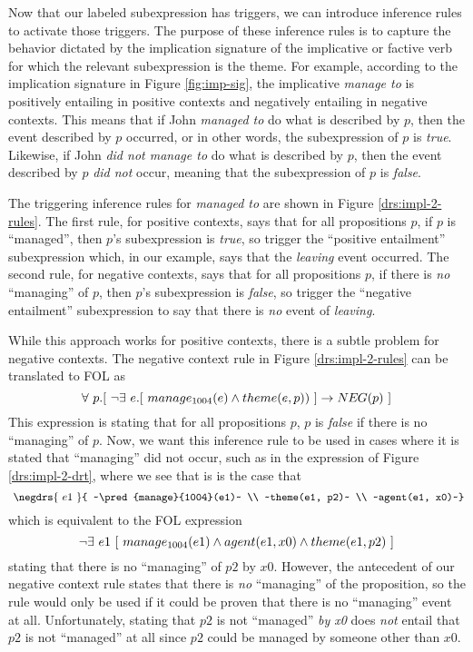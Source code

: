 Now that our labeled subexpression has triggers, we can introduce inference
rules to activate those triggers.  The purpose of these inference rules is to
capture the behavior dictated by the implication signature of the implicative or factive
verb for which the relevant subexpression is the theme.  For example, according
to the implication signature in Figure \ref{fig:imp-sig}, the implicative {\it
manage to} is positively entailing in positive contexts and negatively entailing in negative contexts.
This means that if John {\it managed to} do what is described by $p$, then the
event described by $p$ occurred, or in other words, the subexpression of $p$ is
{\it true}. Likewise, if John {\it did not manage to} do what is described by
$p$, then the event described by $p$ {\it did not} occur, meaning that the
subexpression of $p$ is {\it false}.  

The triggering inference rules for {\it managed to} are shown in Figure
\ref{drs:impl-2-rules}.  The first rule, for positive contexts, says that for
all propositions $p$, if $p$ is ``managed'', then $p$'s subexpression is {\it
true}, so trigger the ``positive entailment'' subexpression which, in our
example, says that the {\it leaving} event occurred.  The second rule, for
negative contexts, says that for all propositions $p$, if there is {\it no}
``managing'' of $p$, then $p$'s subexpression is {\it false}, so trigger the
``negative entailment'' subexpression to say that there is {\it no} event of
{\it leaving}.

While this approach works for positive contexts, there is a subtle problem for
negative contexts.  The negative context rule in Figure \ref{drs:impl-2-rules}
can be translated to FOL as \[ \forall~ p.[~ \lnot \exists~ e.[~ \pred{manage}{1004}(e) 
\land theme(e,p)) ~] \to \NEGPRED{p} ~] \] This expression is stating that for all
propositions $p$, $p$ is {\it false} if there is no ``managing'' of $p$.  Now,
we want this inference rule to be used in cases where it is stated that
``managing'' did not occur, such as in the expression of Figure
\ref{drs:impl-2-drt}, where we see that is is the case that \[ ~\negdrs{~e1~}{ 
~\pred{manage}{1004}(e1)~ \\ ~theme(e1, p2)~ \\ ~agent(e1, x0)~} \] which is
equivalent to the FOL expression \[ \lnot \exists~ e1 ~[~ 
manage_{1004}(e1) \land agent(e1, x0) \land theme(e1, p2) ~] \] 
stating that there is no ``managing''
of $p2$ by $x0$.  However, the antecedent of our negative context rule states
that there is {\it no} ``managing'' of the proposition, so the rule would only
be used if it could be proven that there is no ``managing'' event at all.
Unfortunately, stating that $p2$ is not ``managed'' {\it by x0} does {\it not}
entail that $p2$ is not ``managed'' at all since $p2$ could be managed by
someone other than $x0$.


